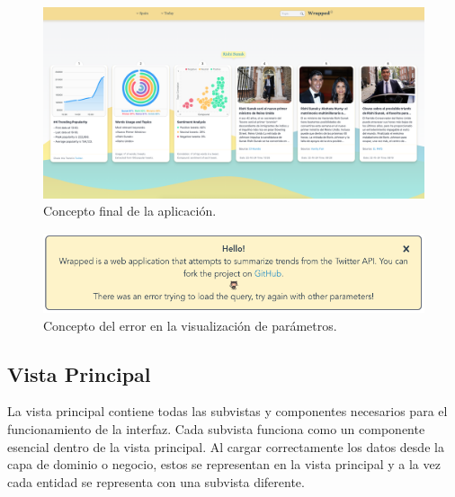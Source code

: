 \begin{figure}[H]
    \centering
    \myfloatalign
    \includegraphics[width=1\textwidth]{gfx/tercer-boceto.png}
    \caption[Concepto final de la aplicación]{Concepto final de la aplicación.}\label{gfx:tercer-boceto}
\end{figure}

\begin{figure}[H]
    \centering
    \myfloatalign
    \includegraphics[width=1\textwidth]{gfx/boceto-error.png}
    \caption[Concepto del error en la visualización de parámetros]{Concepto del error en la visualización de parámetros.}\label{gfx:boceto-error}
\end{figure}

\subsection{Vista Principal}\label{subs:vista-principal}
La vista principal contiene todas las subvistas y componentes necesarios para el funcionamiento de la interfaz. Cada subvista funciona como un componente esencial dentro de la vista principal. Al cargar correctamente los datos desde la capa de dominio o negocio, estos se representan en la vista principal y a la vez cada entidad se representa con una subvista diferente.

